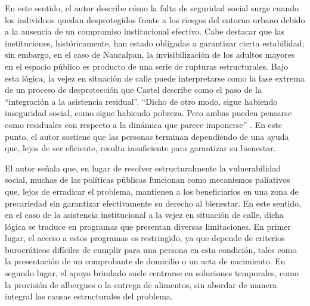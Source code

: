 \documentclass[
  spanish,
  11pt,
  a4paper,
]{scrbook}
\begin{document}
En este sentido, el autor describe cómo la falta de seguridad social
surge cuando los individuos quedan desprotegidos frente a los riesgos
del entorno urbano debido a la ausencia de un compromiso institucional
efectivo. Cabe destacar que las instituciones, históricamente, han
estado obligadas a garantizar cierta estabilidad; sin embargo, en el
caso de Naucalpan, la invisibilización de los adultos mayores en el
espacio público es producto de una serie de rupturas estructurales. Bajo
esta lógica, la vejez en situación de calle puede interpretarse como la
fase extrema de un proceso de desprotección que Castel describe como el
paso de la ``integración a la asistencia residual''. ``Dicho de otro
modo, sigue habiendo inseguridad social, como sigue habiendo pobreza.
Pero ambas pueden pensarse como residuales con respecto a la dinámica
que parece imponerse'' \autocite[49]{Castel2004}. En este punto, el
autor sostiene que las personas terminan dependiendo de una ayuda que,
lejos de ser eficiente, resulta insuficiente para garantizar su
bienestar.

El autor señala que, en lugar de resolver estructuralmente la
vulnerabilidad social, muchas de las políticas públicas funcionan como
mecanismos paliativos que, lejos de erradicar el problema, mantienen a
los beneficiarios en una zona de precariedad sin garantizar
efectivamente su derecho al bienestar. En este sentido, en el caso de la
asistencia institucional a la vejez en situación de calle, dicha lógica
se traduce en programas que presentan diversas limitaciones. En primer
lugar, el acceso a estos programas es restringido, ya que depende de
criterios burocráticos difíciles de cumplir para una persona en esta
condición, tales como la presentación de un comprobante de domicilio o
un acta de nacimiento. En segundo lugar, el apoyo brindado suele
centrarse en soluciones temporales, como la provisión de albergues o la
entrega de alimentos, sin abordar de manera integral las causas
estructurales del problema.
\end{document}
